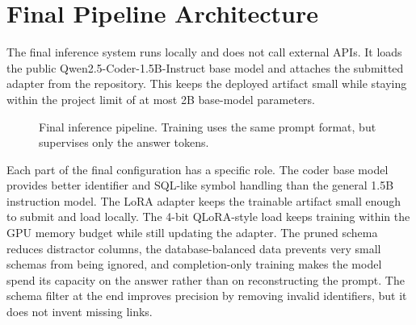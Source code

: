 \documentclass{article}
\begin{document}
\section{Final Pipeline Architecture}

The final inference system runs locally and does not call external APIs. It loads the public
Qwen2.5-Coder-1.5B-Instruct base model and attaches the submitted adapter from the repository.
This keeps the deployed artifact small while staying within the project limit of at most 2B base-model
parameters.

\begin{figure}[H]
\centering
{}
\caption{Final inference pipeline. Training uses the same prompt format, but supervises only the answer tokens.}
\label{fig:pipeline}
\end{figure}

Each part of the final configuration has a specific role. The coder base model provides better
identifier and SQL-like symbol handling than the general 1.5B instruction model. The LoRA adapter
keeps the trainable artifact small enough to submit and load locally. The 4-bit QLoRA-style load
keeps training within the GPU memory budget while still updating the adapter. The pruned schema
reduces distractor columns, the database-balanced data prevents very small schemas from being
ignored, and completion-only training makes the model spend its capacity on the answer rather than
on reconstructing the prompt. The schema filter at the end improves precision by removing invalid
identifiers, but it does not invent missing links.
\end{document}
